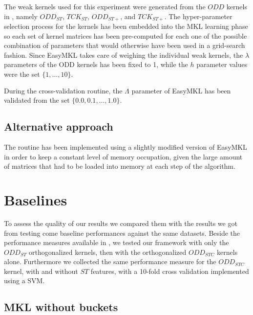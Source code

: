 The weak kernels used for this experiment were generated from the $ODD$ kernels
in \cite{rtesselli}, namely $ODD_{ST}$, $TCK_{ST}$, $ODD_{ST+}$, and $TCK_{ST+}$.
The hyper-parameter selection process for the kernels has been embedded
into the MKL learning phase so each set of kernel matrices has been
pre-computed for each one of the possible combination of parameters that would
otherwise have been used in a grid-search fashion.
Since EasyMKL takes care of weighing the individual weak kernels, the $\lambda$
parameters of the ODD kernels has been fixed to 1, while the $h$ parameter
values were the set $\{1,\dots,10\}$.

During the cross-validation routine, the $\Lambda$ parameter of EasyMKL has been
validated from the set $\{0.0, 0.1,\dots,1.0\}$.


\subsection{Alternative approach}
The routine has been implemented using a slightly modified version of EasyMKL
\cite{easymkl} in order to keep a constant level of memory occupation,
given the large amount of matrices that had to be loaded into memory at each
step of the algorithm.


\section{Baselines}
To assess the quality of our results we compared them with the results we got
from testing come baseline performances against the same datasets.
Beside the performance measures available in \cite{gmkl}, we tested our framework
with only the $ODD_{ST}$ orthogonalized kernels, then with the orthogonalized
$ODD_{STC}$ kernels alone.
Furthermore we collected the same performance measure for the $ODD_{STC}$ kernel,
with and without $ST$ features, with a 10-fold cross validation implemented
using a SVM.

\subsection{MKL without buckets}

